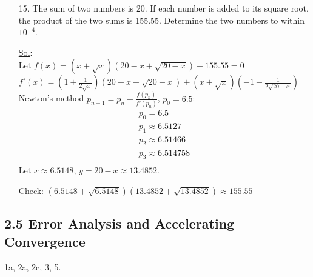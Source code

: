 \begin{enumerate}
  \item[15.] The sum of two numbers is 20. If each number is added to
    its square root, the product of the two sums is 155.55. Determine
    the two numbers to within \( 10^{-4} \).

    \underline{Sol}:\\
    Let \( f(x) = (x + \sqrt{x})(20 - x + \sqrt{20 - x}) - 155.55 = 0 \)\\
    \( f'(x) = \left(1 + \frac{1}{2\sqrt{x}}\right)(20 - x + \sqrt{20
    - x}) + (x + \sqrt{x})\left(-1 - \frac{1}{2\sqrt{20 - x}}\right) \)\\
    Newton's method \( p_{n+1} = p_n - \frac{f(p_n)}{f'(p_n)} \), \(
    p_0 = 6.5 \):
    \[
      \begin{array}{l}
        p_0 = 6.5 \\
        p_1 \approx 6.5127 \\
        p_2 \approx 6.51466 \\
        p_3 \approx 6.514758 \\
      \end{array}
    \]
    Let \( x \approx 6.5148 \), \( y = 20 - x \approx 13.4852 \).

    Check: \( (6.5148 + \sqrt{6.5148})(13.4852 + \sqrt{13.4852})
    \approx 155.55 \)


\end{enumerate}

\subsection*{2.5 Error Analysis and Accelerating Convergence}

1a, 2a, 2c, 3, 5.

